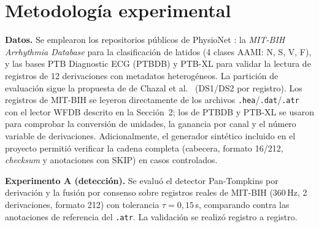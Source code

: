 \section{Metodología experimental}

\textbf{Datos.} Se emplearon los repositorios públicos de PhysioNet
\cite{goldberger2000}: la \emph{MIT-BIH Arrhythmia Database}
\cite{moody2001} para la clasificación de latidos (4 clases AAMI: N, S,
V, F), y las bases PTB Diagnostic ECG (PTBDB) y PTB-XL \cite{wagner2020}
para validar la lectura de registros de 12 derivaciones con metadatos
heterogéneos. La partición de evaluación sigue la propuesta de de Chazal
et al.~\cite{dechazal2004} (DS1/DS2 por registro). Los registros de
MIT-BIH se leyeron directamente de los archivos \texttt{.hea}/\texttt{.dat}/\texttt{.atr}
con el lector WFDB descrito en la Sección~2; los de PTBDB y PTB-XL se
usaron para comprobar la conversión de unidades, la ganancia por canal y
el número variable de derivaciones. Adicionalmente, el generador
sintético incluido en el proyecto permitió verificar la cadena completa
(cabecera, formato 16/212, \emph{checksum} y anotaciones con SKIP) en
casos controlados.

\textbf{Experimento A (detección).} Se evaluó el detector Pan-Tompkins
por derivación y la fusión por consenso sobre registros reales de
MIT-BIH (360\,Hz, 2 derivaciones, formato 212) con tolerancia
$\tau=0{,}15$\,s, comparando contra las anotaciones de referencia del
\texttt{.atr}. La validación se realizó registro a registro.


